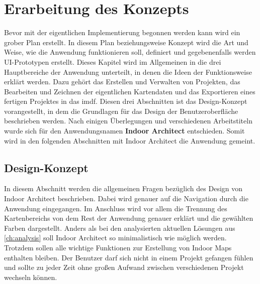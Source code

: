 \chapter{Erarbeitung des Konzepts}\label{ch:conception}
Bevor mit der eigentlichen Implementierung begonnen werden kann wird ein grober Plan erstellt.
In diesem Plan beziehungsweise Konzept wird die Art und Weise, wie die Anwendung funktionieren soll, definiert und gegebenenfalls werden UI-Prototypen erstellt.\pbreak%
%
Dieses Kapitel wird im Allgemeinen in die drei Hauptbereiche der Anwendung unterteilt, in denen die Ideen der Funktionsweise erklärt werden.
Dazu gehört das Erstellen und Verwalten von Projekten, das Bearbeiten und Zeichnen der eigentlichen Kartendaten und das Exportieren eines fertigen Projektes in das \acl{imdf}.
Diesen drei Abschnitten ist das Design-Konzept vorangestellt, in dem die Grundlagen für das Design der Benutzeroberfläche beschrieben werden.\pbreak%
%
Nach einigen Überlegungen und verschiedenen Arbeitstiteln wurde sich für den Anwendungsnamen \textbf{Indoor Architect} entschieden.
Somit wird in den folgenden Abschnitten mit Indoor Architect die Anwendung gemeint.

\section{Design-Konzept}
In diesem Abschnitt werden die allgemeinen Fragen bezüglich des Design von Indoor Architect beschrieben.
Dabei wird genauer auf die Navigation durch die Anwendung eingegangen.
Im Anschluss wird vor allem die Trennung des Kartenbereichs von dem Rest der Anwendung genauer erklärt und die gewählten Farben dargestellt.\pbreak%
%
Anders als bei den analysierten aktuellen Lösungen aus \autoref{ch:analysis} soll Indoor Architect so minimalistisch wie möglich werden.
Trotzdem sollen alle wichtige Funktionen zur Erstellung von Indoor Maps enthalten bleiben.
Der Benutzer darf sich nicht in einem Projekt gefangen fühlen und sollte zu jeder Zeit ohne großen Aufwand zwischen verschiedenen Projekt wechseln können.

